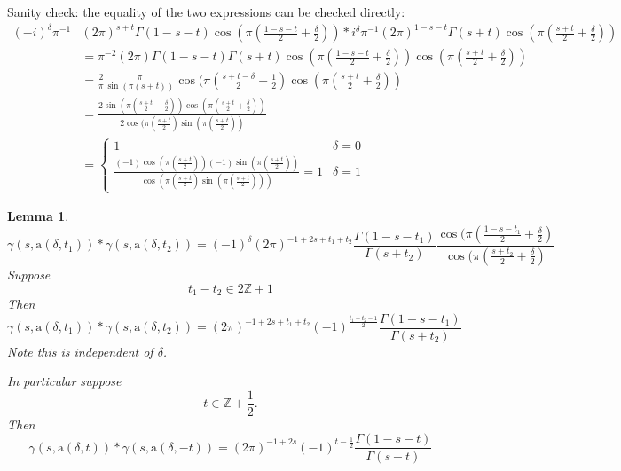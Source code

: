 \documentclass[10pt,leqno]{article}
\newtheorem{lemma}[equation]{Lemma}
\newcommand{\Z}{\mathbb Z}
\renewcommand{\a}{\mathfrak a}
\newcommand\inv{^{-1}}
\renewcommand{\a}{\mathrm a}
\begin{document}
Sanity check: the equality of the two expressions can be checked directly:
$$
\begin{aligned}
  (-i)^\delta\pi\inv& (2\pi)^{s+t}\Gamma(1-s-t)\cos(\pi(\frac{1-s-t}2+\frac\delta 2))*
  i^\delta\pi\inv(2\pi)^{1-s-t}\Gamma(s+t)\cos(\pi(\frac{s+t}2+\frac\delta 2))\\
  &=\pi^{-2}(2\pi) \Gamma(1-s-t)\Gamma(s+t)
  \cos(\pi(\frac{1-s-t}2+\frac\delta 2))\cos(\pi(\frac{s+t}2+\frac\delta 2))\\
  &=  \frac2\pi\frac{\pi}{\sin(\pi(s+t))}\cos(\pi(\frac{s+t-\delta}2-\frac12)\cos(\pi(\frac{s+t}2+\frac\delta 2))\\
  &=  \frac{2\sin(\pi(\frac{s+t}2-\frac\delta2))\cos(\pi(\frac{s+t}2+\frac\delta2))}{2\cos(\pi(\frac{s+t}2)\sin(\pi(\frac{s+t}2))}\\
  &=\begin{cases}1&\delta=0\\
  \frac{(-1)\cos(\pi(\frac{s+t}2))(-1)\sin(\pi(\frac{s+t}2))}{\cos(\pi(\frac{s+t}2)\sin(\pi(\frac{s+t}2)))}=1&\delta=1
  \end{cases}
\end{aligned}
$$


\begin{lemma}
$$ \gamma(s,\a(\delta,t_1))*\gamma(s,\a(\delta,t_2))=(-1)^\delta(2\pi)^{-1+2s+t_1+t_2}\frac{\Gamma(1-s-t_1)}{\Gamma(s+t_2)}\frac{\cos(\pi(\frac{1-s-t_1}2+\frac\delta2)}
  {\cos(\pi(\frac{s+t_2}2+\frac\delta2)}
  $$
  Suppose
  $$
  t_1-t_2\in 2\Z+1
  $$
  Then
$$ \gamma(s,\a(\delta,t_1))*\gamma(s,\a(\delta,t_2))=(2\pi)^{-1+2s+t_1+t_2}(-1)^{\frac{t_1-t_2-1}2}\frac{\Gamma(1-s-t_1)}{\Gamma(s+t_2)}
$$
Note this is independent of $\delta$.

  In particular suppose
  $$
t\in \Z+\frac12.
  $$
  Then
$$
  \gamma(s,\a(\delta,t))*\gamma(s,\a(\delta,-t))=(2\pi)^{-1+2s}(-1)^{t-\frac12}\frac{\Gamma(1-s-t)}{\Gamma(s-t)}
  $$
\end{lemma}
\end{document}
